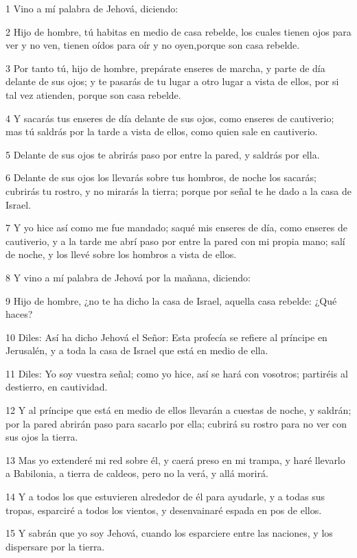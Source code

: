 \par 1 Vino a mí palabra de Jehová, diciendo:
\par 2 Hijo de hombre, tú habitas en medio de casa rebelde, los cuales tienen ojos para ver y no ven, tienen oídos para oír y no oyen,porque son casa rebelde.
\par 3 Por tanto tú, hijo de hombre, prepárate enseres de marcha, y parte de día delante de sus ojos; y te pasarás de tu lugar a otro lugar a vista de ellos, por si tal vez atienden, porque son casa rebelde.
\par 4 Y sacarás tus enseres de día delante de sus ojos, como enseres de cautiverio; mas tú saldrás por la tarde a vista de ellos, como quien sale en cautiverio.
\par 5 Delante de sus ojos te abrirás paso por entre la pared, y saldrás por ella.
\par 6 Delante de sus ojos los llevarás sobre tus hombros, de noche los sacarás; cubrirás tu rostro, y no mirarás la tierra; porque por señal te he dado a la casa de Israel.
\par 7 Y yo hice así como me fue mandado; saqué mis enseres de día, como enseres de cautiverio, y a la tarde me abrí paso por entre la pared con mi propia mano; salí de noche, y los llevé sobre los hombros a vista de ellos.
\par 8 Y vino a mí palabra de Jehová por la mañana, diciendo:
\par 9 Hijo de hombre, ¿no te ha dicho la casa de Israel, aquella casa rebelde: ¿Qué haces?
\par 10 Diles: Así ha dicho Jehová el Señor: Esta profecía se refiere al príncipe en Jerusalén, y a toda la casa de Israel que está en medio de ella.
\par 11 Diles: Yo soy vuestra señal; como yo hice, así se hará con vosotros; partiréis al destierro, en cautividad. 
\par 12 Y al príncipe que está en medio de ellos llevarán a cuestas de noche, y saldrán; por la pared abrirán paso para sacarlo por ella; cubrirá su rostro para no ver con sus ojos la tierra.
\par 13 Mas yo extenderé mi red sobre él, y caerá preso en mi trampa, y haré llevarlo a Babilonia, a tierra de caldeos, pero no la verá, y allá morirá.
\par 14 Y a todos los que estuvieren alrededor de él para ayudarle, y a todas sus tropas, esparciré a todos los vientos, y desenvainaré espada en pos de ellos. 
\par 15 Y sabrán que yo soy Jehová, cuando los esparciere entre las naciones, y los dispersare por la tierra.

